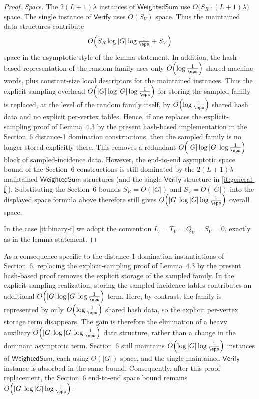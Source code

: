 \begin{proof}
\emph{Space.}
The $2(L+1)\lambda$ instances of $\mathsf{WeightedSum}$ use
$O\!\bigl(S_R\cdot (L+1)\lambda\bigr)$ space.
The single instance of $\mathsf{Verify}$ uses $O(S_V)$ space.
Thus the maintained data structures contribute
\[
O\!\left(S_R\log|G|\log\tfrac{1}{\eps} + S_V\right)
\]
space in the asymptotic style of the lemma statement.
In addition, the hash-based representation of the random family uses only
$O\!\left(\log\tfrac{1}{\eps}\right)$ shared machine words, plus
constant-size local descriptors for the maintained instances.
Thus the explicit-sampling overhead
$O\!\left(|G|\log|G|\log\tfrac{1}{\eps}\right)$ for storing the sampled family
is replaced, at the level of the random family itself, by
$O\!\left(\log\tfrac{1}{\eps}\right)$ shared hash data and no explicit
per-vertex tables.
Hence, if one replaces the explicit-sampling proof of Lemma~4.3 by the present
hash-based implementation in the Section~6 distance-1 domination
constructions, then the sampled family is no longer stored explicitly there.
This removes a redundant
$O\!\left(|G|\log|G|\log\tfrac{1}{\eps}\right)$ block of sampled-incidence
data.
However, the end-to-end asymptotic space bound of the Section~6 constructions
is still dominated by the $2(L+1)\lambda$ maintained
$\mathsf{WeightedSum}$ structures (and the single $\mathsf{Verify}$ structure
in \cref{it:general-f}).
Substituting the Section~6 bounds $S_R=O(|G|)$ and $S_V=O(|G|)$ into the
displayed space formula above therefore still gives
$O\!\left(|G|\log|G|\log\tfrac{1}{\eps}\right)$ overall space.

In the case \cref{it:binary-f} we adopt the convention
$I_V=T_V=Q_V=S_V=0$, exactly as in the lemma statement.
\end{proof}

As a consequence specific to the distance-1 domination instantiations of
Section~6, replacing the explicit-sampling proof of Lemma~4.3 by the present
hash-based proof removes the explicit storage of the sampled family. In the
explicit-sampling realization, storing the sampled incidence tables contributes
an additional
$O\!\left(|G|\log|G|\log\tfrac{1}{\eps}\right)$ term. Here, by contrast, the
family is represented by only
$O\!\left(\log\tfrac{1}{\eps}\right)$ shared hash data, so the explicit
per-vertex storage term disappears. The gain is therefore the elimination of a
heavy auxiliary
$O\!\left(|G|\log|G|\log\tfrac{1}{\eps}\right)$ data structure, rather than a
change in the dominant asymptotic term. Section~6 still maintains
$O\!\left(\log|G|\log\tfrac{1}{\eps}\right)$ instances of
$\mathsf{WeightedSum}$, each using $O(|G|)$ space, and the single maintained
$\mathsf{Verify}$ instance is absorbed in the same bound. Consequently, after
this proof replacement, the Section~6 end-to-end space bound remains
$O\!\left(|G|\log|G|\log\tfrac{1}{\eps}\right)$.
